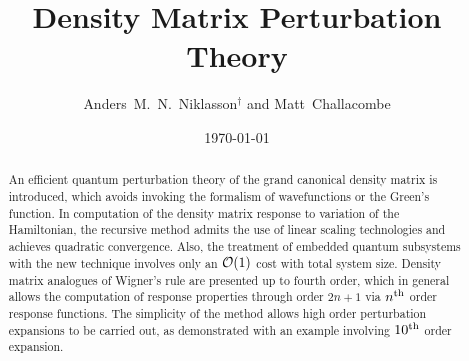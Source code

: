 \documentclass[prl,aps,twocolumn,showpacs,twocolumngrid,superbib]{revtex4}
\begin{document}
\title{Density Matrix Perturbation Theory}

\author{Anders~M.~N.~Niklasson$^\dagger$  and Matt~Challacombe}

\address{Theoretical Division, Los Alamos National Laboratory,
Los Alamos, NM 87545, USA}

\begin{abstract}
An efficient quantum perturbation theory of the grand canonical density matrix 
is introduced, which avoids invoking the formalism of wavefunctions or the Green's function.  
In computation of the density matrix response to variation of the Hamiltonian,
the recursive method admits the use of linear scaling technologies and achieves
quadratic convergence.  Also, the treatment of embedded quantum subsystems with the new 
technique involves only an ${\cal O}(1)$ cost with total system size.   
Density matrix analogues of  Wigner's  rule are presented up to fourth order,
which in general allows the computation of response properties through order $2 n+1$ 
via  $n^{\rm th}$ order response functions.
The simplicity of the method allows high order perturbation expansions to be carried
out, as demonstrated with an example involving $10^{\rm th}$ order expansion. 
\\

\end{abstract}

\date{\today}

\maketitle

\end{document}
